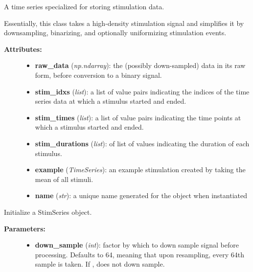 \documentclass[letterpaper,10pt,english]{sphinxmanual}
\begin{document}
\begin{fulllineitems}
\label{data_structures:stimulation.StimSeries}
A time series specialized for storing stimulation data.

Essentially, this class takes a high-density stimulation signal and simplifies it by downsampling, binarizing, and optionally uniformizing stimulation events.
\begin{description}
\item[{\textbf{Attributes:}}] \leavevmode\begin{itemize}
\item {} 
\textbf{raw\_data} (\emph{np.ndarray}): the (possibly down-sampled) data in its raw form, before conversion to a binary signal.

\item {} 
\textbf{stim\_idxs} (\emph{list}): a list of value pairs  indicating the indices of the time series data at which a stimulus started and ended.

\item {} 
\textbf{stim\_times} (\emph{list}): a list of value pairs  indicating the time points at which a stimulus started and ended.

\item {} 
\textbf{stim\_durations} (\emph{list}): of list of values indicating the duration of each stimulus.

\item {} 
\textbf{example} (\emph{TimeSeries}): an example stimulation created by taking the mean of all stimuli.

\item {} 
\textbf{name} (\emph{str}): a unique name generated for the object when instantiated

\end{itemize}

\end{description}

\begin{fulllineitems}
\label{data_structures:stimulation.StimSeries.__init__}
Initialize a StimSeries object.
\begin{description}
\item[{\textbf{Parameters:}}] \leavevmode\begin{itemize}
\item {} 
\textbf{down\_sample} (\emph{int}): factor by which to down sample signal before processing. Defaults to 64, meaning that upon resampling, every 64th sample is taken. If , does not down sample.


\end{itemize}
\end{description}
\end{fulllineitems}
\end{fulllineitems}
\end{document}
